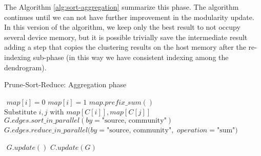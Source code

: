 The Algorithm \ref{alg:sort-aggregation} summarize this phase. 
The algorithm continues until we can not have further improvement in the modularity update. In this version of the algorithm, we keep only the best result to not occupy several device memory, but it is possible trivially save the intermediate result adding a step that copies the clustering results on the host memory after the re-indexing sub-phase (in this way we have consistent indexing among the dendrogram).
\begin{algorithm}
	\caption{Prune-Sort-Reduce: Aggregation phase}\label{alg:sort-aggregation}
	\begin{algorithmic}
		\State $ $
		\State $map[i] = 0$
		\Else
		\State $map[i] = 1$
		\EndIf
		\EndFor 
		\State $map.prefix\_sum()$
		\State $ $
			\State $\text{Substitute } i , j \text{ with } map[C[i]], map[C[j]]$
		\EndFor 
		\State $ $
		\State $G.edges.sort\_in\_parallel(by= \text{"source, community"})$
		\State $G.edges.reduce\_in\_parallel(by= \text{"source, community"}, $
		\Statex[9] $operation= \text{"sum"})$

		\State $ $
		\State $G.update()$
		\State $C.update(G)$	
		\EndProcedure
	\end{algorithmic}
\end{algorithm}
